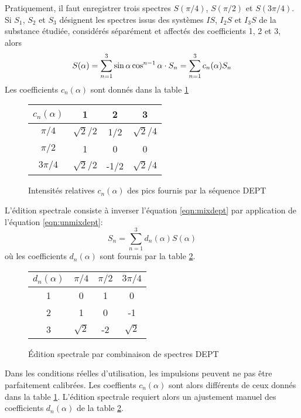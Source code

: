 Pratiquement, il faut enregistrer trois spectres $S(\pi/4)$, $S(\pi/2)$ et $S(3\pi/4)$.
Si $S_1$, $S_2$ et $S_3$ désignent les spectres issus des systèmes
$IS$, $I_2S$ et $I_3S$ de la substance étudiée, considérés séparément et affectés des
coefficients 1, 2 et 3, alors
\begin{equation}
\label{eqn:mixdept}
S(\alpha) = \sum_{n=1}^3\sin\alpha\cos^{n-1}\alpha \cdot S_n = \sum_{n=1}^3 c_n(\alpha) S_n
\end{equation}
Les coefficients $c_n(\alpha)$ sont donnés dans la table \ref{tab:mixdept}

\begin{figure}[hbt]
\begin{center}
\begin{tabular}{c|ccc}
$c_n(\alpha)$  & 1 & 2 & 3 \\
\hline
$\pi/4$ & $\sqrt{2}/2$ & 1/2 & $\sqrt{2}/4$ \\
$\pi/2$ & 1 & 0 & 0 \\
$3\pi/4$ & $\sqrt{2}/2$ & -1/2 & $\sqrt{2}/4$
\end{tabular}
\caption{\label{tab:mixdept}
Intensités relatives $c_n(\alpha)$ des pics fournis par la séquence DEPT}
\end{center}
\end{figure}

L'édition spectrale consiste à inverser l'équation \ref{eqn:mixdept} par application
de l'équation \ref{eqn:unmixdept}:
\begin{equation}
\label{eqn:unmixdept}
S_n = \sum_{n=1}^3 d_n(\alpha) S(\alpha)
\end{equation}
où les coefficients $d_n(\alpha)$ sont fournis par la table \ref{tab:unmixdept}.

\begin{figure}[hbt]
\begin{center}
\begin{tabular}{c|ccc}
$d_n(\alpha)$  & $\pi/4$ & $\pi/2$ & $3\pi/4$ \\
\hline
1 & 0 & 1 & 0 \\
2 & 1 & 0 & -1 \\
3 & $\sqrt{2}$ & -2 & $\sqrt{2}$
\end{tabular}
\caption{\label{tab:unmixdept}
Édition spectrale par combinaison de spectres DEPT}
\end{center}
\end{figure}

Dans les conditions réelles d'utilisation, les impulsions peuvent ne pas être
parfaitement calibrées.
Les coeffients $c_n(\alpha)$ sont alors différents de ceux donnés dans la table
\ref{tab:mixdept}.
L'édition spectrale requiert alors un ajustement manuel des coefficients $d_n(\alpha)$
de la table \ref{tab:unmixdept}.


